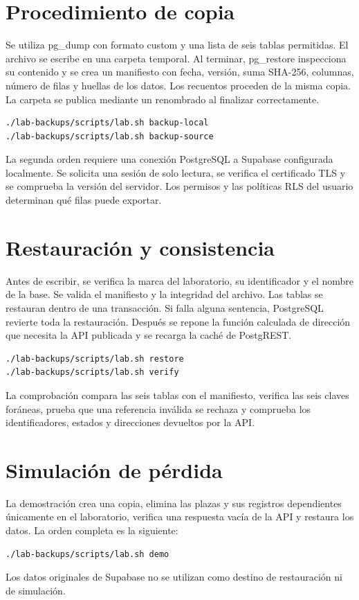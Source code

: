 \documentclass[11pt,a4paper]{article}
\begin{document}
\section{Procedimiento de copia}
Se utiliza pg\_dump con formato custom y una lista de seis tablas permitidas. El archivo se escribe en una carpeta temporal. Al terminar, pg\_restore inspecciona su contenido y se crea un manifiesto con fecha, versión, suma SHA-256, columnas, número de filas y huellas de los datos. Los recuentos proceden de la misma copia. La carpeta se publica mediante un renombrado al finalizar correctamente.

\begin{lstlisting}
./lab-backups/scripts/lab.sh backup-local
./lab-backups/scripts/lab.sh backup-source
\end{lstlisting}
La segunda orden requiere una conexión PostgreSQL a Supabase configurada localmente. Se solicita una sesión de solo lectura, se verifica el certificado TLS y se comprueba la versión del servidor. Los permisos y las políticas RLS del usuario determinan qué filas puede exportar.

\section{Restauración y consistencia}
Antes de escribir, se verifica la marca del laboratorio, su identificador y el nombre de la base. Se valida el manifiesto y la integridad del archivo. Las tablas se restauran dentro de una transacción. Si falla alguna sentencia, PostgreSQL revierte toda la restauración. Después se repone la función calculada de dirección que necesita la API publicada y se recarga la caché de PostgREST.

\begin{lstlisting}
./lab-backups/scripts/lab.sh restore
./lab-backups/scripts/lab.sh verify
\end{lstlisting}
La comprobación compara las seis tablas con el manifiesto, verifica las seis claves foráneas, prueba que una referencia inválida se rechaza y comprueba los identificadores, estados y direcciones devueltos por la API.

\section{Simulación de pérdida}
La demostración crea una copia, elimina las plazas y sus registros dependientes únicamente en el laboratorio, verifica una respuesta vacía de la API y restaura los datos. La orden completa es la siguiente:
\begin{lstlisting}
./lab-backups/scripts/lab.sh demo
\end{lstlisting}
Los datos originales de Supabase no se utilizan como destino de restauración ni de simulación.
\end{document}
